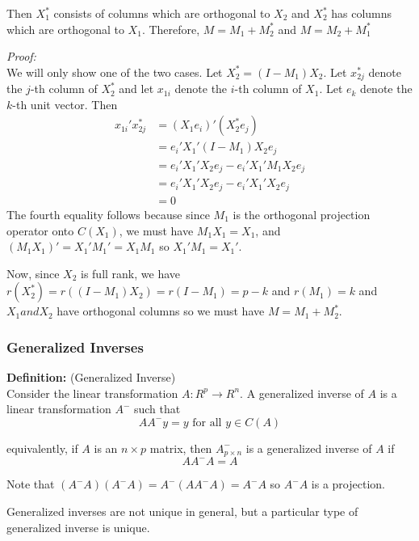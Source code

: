 \documentclass[12pt]{article}
\numberwithin{equation}{section}
\begin{document}
Then $X_1^*$ consists of columns which are orthogonal to $X_2$ and $X_2^*$ has columns which are orthogonal to $X_1$. Therefore, $M = M_1 + M_2^{*}$ and $M = M_2 + M_1^{*}$

\textit{Proof:} \\
We will only show one of the two cases. Let $X_2^{*} = (I - M_1)X_2$. Let $x^{*}_{2j}$ denote the $j$-th column of $X_2^{*}$ and let $x_{1i}$ denote the $i$-th column of $X_1$. Let $e_k$ denote the $k$-th unit vector. Then
\begin{align*}
  x_{1i}'x_{2j}^* &= (X_1 e_i)' (X_2^{*} e_j) \\
    &= e_i' X_1' (I - M_1)X_2 e_j \\
    &= e_i' X_1' X_2 e_j - e_i' X_1' M_1 X_2 e_j \\
    &= e_i' X_1' X_2 e_j - e_i' X_1' X_2 e_j \\
    &= 0
\end{align*}
The fourth equality follows because since $M_1$ is the orthogonal projection operator onto $C(X_1)$, we must have $M_1 X_1 = X_1$, and $(M_1 X_1)' = X_1 ' M_1' = X_1 M_1$ so $X_1' M_1 = X_1'$.

Now, since $X_2$ is full rank, we have $r(X_2^*) = r((I - M_1) X_2) = r(I - M_1) = p - k$ and $r(M_1) = k$ and $X_1 and X_2$ have orthogonal columns so we must have $M = M_1 + M_2^{*}$.

\subsubsection{Generalized Inverses}
\textbf{Definition:} (Generalized Inverse) \\
Consider the linear transformation $A : R^p \to R^n$. A generalized inverse of $A$ is a linear transformation $A^{-}$ such that
\begin{equation*}
  A A^{-} y = y \text{ for all } y \in C(A)
\end{equation*}

equivalently, if $A$ is an $n \times p$ matrix, then $A^{-}_{p \times n}$ is a generalized inverse of $A$ if
%
\begin{equation*}
  A A^{-} A = A
\end{equation*}

Note that
$(A^- A)(A^- A) = A^- (A A^- A) = A^- A$
so $A^- A$ is a projection.

Generalized inverses are not unique in general, but a particular type of generalized inverse is unique.
\end{document}
